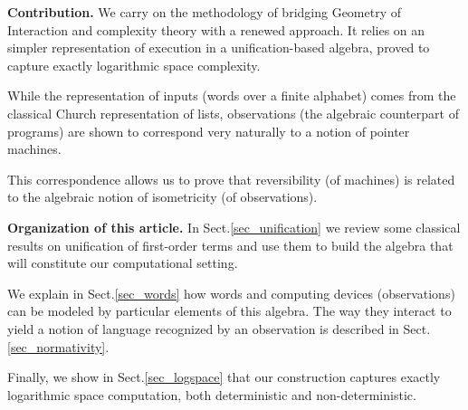 

\smallskip

\bigskip\noindent
\textbf{Contribution.}
We carry on the methodology of bridging Geometry of Interaction and complexity theory with a renewed approach.
It relies on an simpler representation of execution in a unification-based algebra, proved to capture exactly logarithmic space complexity.

While the representation of inputs (words over a finite alphabet) comes from the classical Church representation of lists, observations (the algebraic counterpart of programs) are shown to correspond  very naturally to a notion of pointer machines.

This correspondence allows us to prove that reversibility (of machines) is related to the algebraic notion of isometricity (of observations).




\smallskip\noindent
\textbf{Organization of this article.} In Sect.\ref{sec_unification} we review some classical results on unification of first-order terms and use them to build the algebra that will constitute our computational setting.

We explain in Sect.\ref{sec_words} how words and computing devices (observations) can be modeled by particular elements of this algebra.
The way they interact to yield a notion of language recognized by an observation is described in Sect.\ref{sec_normativity}.

Finally, we show in Sect.\ref{sec_logspace} that our construction captures exactly logarithmic space computation, both deterministic and non-deterministic.

\vspace{-2mm}

